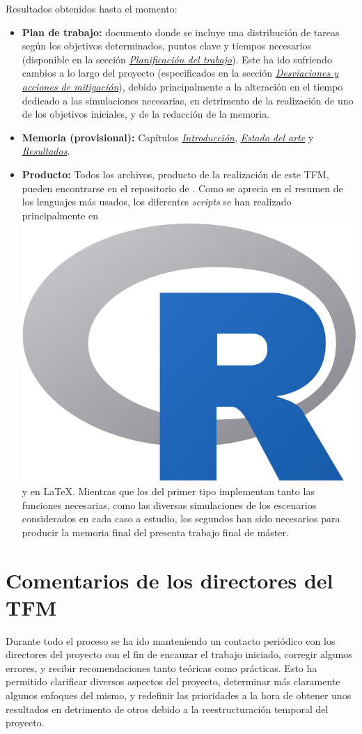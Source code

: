 \documentclass[IB,BIB]{TFUOC}%
\newcommand{\Rlogo}{\protect\includegraphics[height=2.5ex,keepaspectratio]{Rlogo.png}}
\begin{document}
Resultados obtenidos hasta el momento:

\footnotesize

\begin{itemize}
    \item \textbf{Plan de trabajo:} documento donde se incluye una distribución de tareas según los objetivos determinados, puntos clave y tiempos necesarios (disponible en la sección \textit{\hyperref[sec:Planificación del trabajo]{Planificación del trabajo}}). Este ha ido sufriendo cambios a lo largo del proyecto (especificados en la sección \textit{\hyperref[sec:Desviaciones y acciones de mitigación]{Desviaciones y acciones de mitigación}}), debido principalmente a la alteración en el tiempo dedicado a las simulaciones necesarias, en detrimento de la realización de uno de los objetivos iniciales, y de la redacción de la memoria.
    \item \textbf{Memoria (provisional):} Capítulos \textit{\hyperref[chap:Introducción]{Introducción}}, \textit{\hyperref[chap:Estado del arte]{Estado del arte}} y \textit{\hyperref[chap:Resultados]{Resultados}}.
    \item \textbf{Producto:} Todos los archivos, producto de la realización de este TFM, pueden encontrarse en el repositorio de  \cite{aitor_invernon_de_campos_codigo_2024}. Como se aprecia en el resumen de los lenguajes más usados, los diferentes \textit{scripts} se han realizado principalmente en \hspace{-.2em}\Rlogo\hspace{+.1em} y en \LaTeX. Mientras que los del primer tipo implementan tanto las funciones necesarias, como las diversas simulaciones de los escenarios considerados en cada caso a estudio, los segundos han sido necesarios para producir la memoria final del presenta trabajo final de máster.
\end{itemize}

\normalsize

\section{Comentarios de los directores del TFM}
\label{sec:Comentarios de los directores del TFM}

Durante todo el proceso se ha ido manteniendo un contacto periódico con los directores del proyecto con el fin de encauzar el trabajo iniciado, corregir algunos errores, y recibir recomendaciones tanto teóricas como prácticas. Esto ha permitido clarificar diversos aspectos del proyecto, determinar más claramente algunos enfoques del mismo, y redefinir las prioridades a la hora de obtener unos resultados en detrimento de otros debido a la reestructuración temporal del proyecto.
\end{document}

